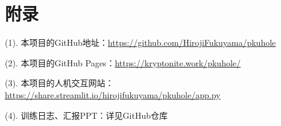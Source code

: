 \documentclass[12pt,a4paper]{article}
\begin{document}
\section*{附录}

(1). 本项目的GitHub地址：\href{https://github.com/HirojiFukuyama/pkuhole}{https://github.com/HirojiFukuyama/pkuhole}

(2). 本项目的GitHub Pages：\href{https://kryptonite.work/pkuhole/}{https://kryptonite.work/pkuhole/}

(3). 本项目的人机交互网站：\href{https://share.streamlit.io/hirojifukuyama/pkuhole/app.py}{https://share.streamlit.io/hirojifukuyama/pkuhole/app.py}

(4). 训练日志、汇报PPT：详见GitHub仓库
\end{document}
